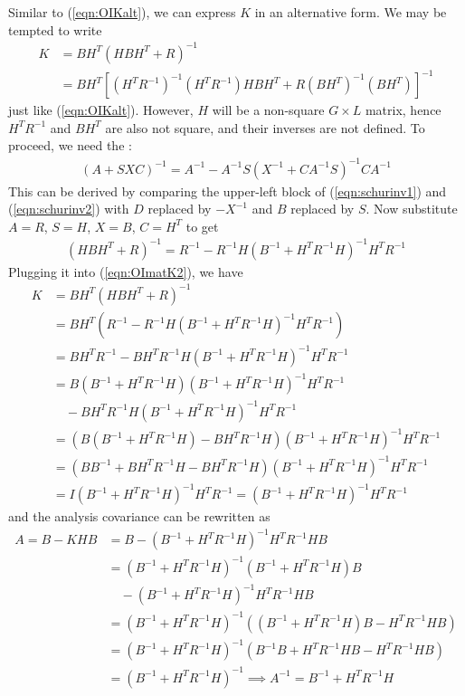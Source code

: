Similar to (\ref{eqn:OIKalt}), we can express $K$ in an alternative form. We may be tempted to write 
\begin{align*}
K &= BH^T(HBH^T+R)^{-1} \\
&= BH^T[(H^TR^{-1})^{-1}(H^TR^{-1})HBH^T+R(BH^T)^{-1}(BH^T)]^{-1} 
\end{align*}
just like (\ref{eqn:OIKalt}). However, $H$ will be a non-square $G \times L$ matrix, hence $H^TR^{-1}$ and $BH^T$ are also not square, and their inverses are not defined. To proceed, we need the :
\begin{align}
(A + SXC)^{-1} = A^{-1} - A^{-1}S(X^{-1} + CA^{-1}S)^{-1}CA^{-1}
\end{align}
This can be derived by comparing the upper-left block of (\ref{eqn:schurinv1}) and (\ref{eqn:schurinv2}) with $D$ replaced by $-X^{-1}$ and $B$ replaced by $S$. Now substitute $A = R$, $S = H$, $X = B$, $C=H^T$ to get
\begin{align}
(HBH^T + R)^{-1} = R^{-1} - R^{-1}H(B^{-1} + H^TR^{-1}H)^{-1}H^T R^{-1}    
\end{align}
Plugging it into (\ref{eqn:OImatK2}), we have
\begin{align}
K &= BH^T(HBH^T+R)^{-1} \nonumber \\
&= BH^T(R^{-1} - R^{-1}H(B^{-1} + H^TR^{-1}H)^{-1}H^T R^{-1}) \nonumber \\
&= BH^TR^{-1} - BH^TR^{-1}H(B^{-1} + H^TR^{-1}H)^{-1}H^T R^{-1} \nonumber \\
&= B(B^{-1} + H^TR^{-1}H)(B^{-1} + H^TR^{-1}H)^{-1}H^TR^{-1} \nonumber \\
&\quad- BH^TR^{-1}H(B^{-1} + H^TR^{-1}H)^{-1}H^T R^{-1} \nonumber \\
&= (B(B^{-1} + H^TR^{-1}H) - BH^TR^{-1}H)(B^{-1} + H^TR^{-1}H)^{-1}H^TR^{-1} \nonumber \\
&= (BB^{-1} + BH^TR^{-1}H - BH^TR^{-1}H)(B^{-1} + H^TR^{-1}H)^{-1}H^TR^{-1} \nonumber \\
&= I(B^{-1} + H^TR^{-1}H)^{-1}H^TR^{-1} = (B^{-1} + H^TR^{-1}H)^{-1}H^TR^{-1}
\end{align}
and the analysis covariance can be rewritten as
\begin{align}
A = B - KHB &= B - (B^{-1} + H^TR^{-1}H)^{-1}H^TR^{-1}HB \nonumber \\
&= (B^{-1} + H^TR^{-1}H)^{-1}(B^{-1} + H^TR^{-1}H)B \nonumber \\
&\quad- (B^{-1} + H^TR^{-1}H)^{-1}H^TR^{-1}HB \nonumber \\
&= (B^{-1} + H^TR^{-1}H)^{-1}((B^{-1} + H^TR^{-1}H)B - H^TR^{-1}HB) \nonumber \\
&= (B^{-1} + H^TR^{-1}H)^{-1}(B^{-1}B + H^TR^{-1}HB - H^TR^{-1}HB) \nonumber \\
&= (B^{-1} + H^TR^{-1}H)^{-1} \implies A^{-1} = B^{-1} + H^TR^{-1}H
\end{align}

